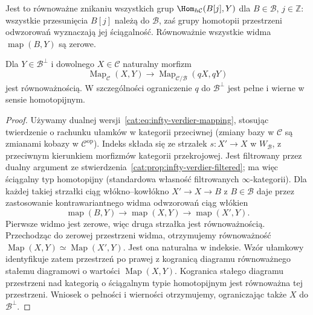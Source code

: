 Jest to równoważne znikaniu wszystkich grup $\Hom_{h\mathcal C}(B[j],Y)$ dla $B\in\mathcal B$, $j\in\mathbb Z$: wszystkie przesunięcia $B[j]$ należą do $\mathcal B$, zaś grupy homotopii przestrzeni odwzorowań wyznaczają jej ściągalność. Równoważnie wszystkie widma $\operatorname{map}(B,Y)$ są zerowe.

\begin{stwierdzenie}\label{cat:prop:infty-verdier-orthogonal-map}
Dla $Y\in\mathcal B^\perp$ i dowolnego $X\in\mathcal C$ naturalny morfizm
\[
 \operatorname{Map}_{\mathcal C}(X,Y)
 \longrightarrow\operatorname{Map}_{\mathcal C/\mathcal B}(qX,qY)
\]
jest równoważnością. W szczególności ograniczenie $q$ do $\mathcal B^\perp$ jest pełne i wierne w sensie homotopijnym.
\end{stwierdzenie}
\begin{proof}
Używamy dualnej wersji~\eqref{cat:eq:infty-verdier-mapping}, stosując twierdzenie o rachunku ułamków w kategorii przeciwnej (zmiany bazy w $\mathcal C$ są zmianami kobazy w $\mathcal C^{\mathrm{op}}$). Indeks składa się ze strzałek $s:X'\to X$ w $W_{\mathcal B}$, z przeciwnym kierunkiem morfizmów kategorii przekrojowej. Jest filtrowany przez dualny argument ze stwierdzenia~\ref{cat:prop:infty-verdier-filtered}; ma więc ściągalny typ homotopijny (standardowa własność filtrowanych $\infty$-kategorii). Dla każdej takiej strzałki ciąg włókno--kowłókno $X'\to X\to B$ z $B\in\mathcal B$ daje przez zastosowanie kontrawariantnego widma odwzorowań ciąg włókien
\[
 \operatorname{map}(B,Y)\to\operatorname{map}(X,Y)
 \to\operatorname{map}(X',Y).
\]
Pierwsze widmo jest zerowe, więc druga strzałka jest równoważnością. Przechodząc do zerowej przestrzeni widma, otrzymujemy równoważność $\operatorname{Map}(X,Y)\simeq\operatorname{Map}(X',Y)$. Jest ona naturalna w indeksie. Wzór ułamkowy identyfikuje zatem przestrzeń po prawej z kogranicą diagramu równoważnego stałemu diagramowi o wartości $\operatorname{Map}(X,Y)$. Kogranica stałego diagramu przestrzeni nad kategorią o ściągalnym typie homotopijnym jest równoważna tej przestrzeni. Wniosek o pełności i wierności otrzymujemy, ograniczając także $X$ do $\mathcal B^\perp$.
\end{proof}

